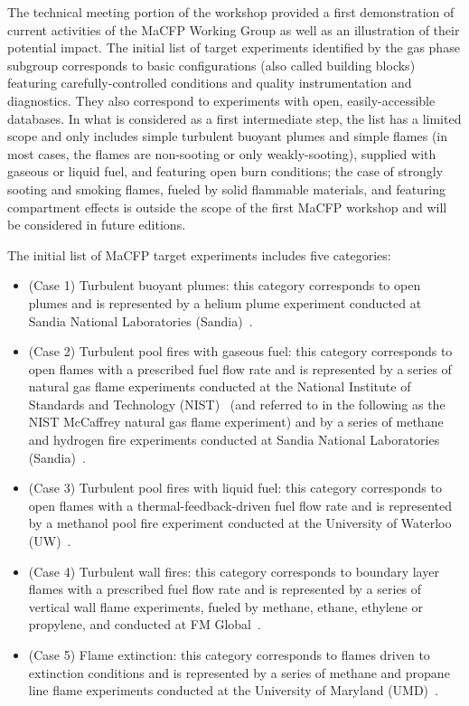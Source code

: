 The technical meeting portion of the workshop provided a first demonstration of current activities of the MaCFP Working Group as well as an illustration of their potential impact. The initial list of target experiments identified by the gas phase subgroup corresponds to basic configurations (also called building blocks) featuring carefully-controlled conditions and quality instrumentation and diagnostics. They also correspond to experiments with open, easily-accessible databases. In what is considered as a first intermediate step, the list has a limited scope and only includes simple turbulent buoyant plumes and simple flames (in most cases, the flames are non-sooting or only weakly-sooting), supplied with gaseous or liquid fuel, and featuring open burn conditions; the case of strongly sooting and smoking flames, fueled by solid flammable materials, and featuring compartment effects is outside the scope of the first MaCFP workshop and will be considered in future editions.

The initial list of MaCFP target experiments includes five categories:
\begin{itemize}
\item (Case 1) Turbulent buoyant plumes: this category corresponds to open plumes and is represented by a helium plume experiment conducted at Sandia National Laboratories (Sandia)~\cite{Case1_EXP}.
\item (Case 2) Turbulent pool fires with gaseous fuel: this category corresponds to open flames with a prescribed fuel flow rate and is represented by a series of natural gas flame experiments conducted at the National Institute of Standards and Technology (NIST)~\cite{Case2a_EXP} (and referred to in the following as the NIST McCaffrey natural gas flame experiment) and by a series of methane and hydrogen fire experiments conducted at Sandia National Laboratories (Sandia)~\cite{Case2b_EXP_CH4,Case2b_EXP_H2}.
\item (Case 3) Turbulent pool fires with liquid fuel: this category corresponds to open flames with a thermal-feedback-driven fuel flow rate and is represented by a methanol pool fire experiment conducted at the University of Waterloo (UW)~\cite{Case3_EXP_1,Case3_EXP_2}.
\item (Case 4) Turbulent wall fires: this category corresponds to boundary layer flames with a prescribed fuel flow rate and is represented by a series of vertical wall flame experiments, fueled by methane, ethane, ethylene or propylene, and conducted at FM Global~\cite{Case4_EXP_1,Case4_EXP_2}.
\item (Case 5) Flame extinction: this category corresponds to flames driven to extinction conditions and is represented by a series of methane and propane line flame experiments conducted at the University of Maryland (UMD)~\cite{Case5_EXP_1,Case5_EXP_2,Case5_EXP_3}.
\end{itemize}

